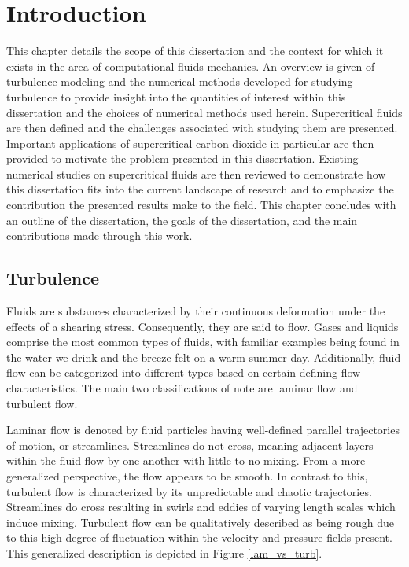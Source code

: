 \chapter{Introduction}
This chapter details the scope of this dissertation and the context for which it exists in the area of computational fluids mechanics. An overview is given of turbulence modeling and the numerical methods developed for studying turbulence to provide insight into the quantities of interest within this dissertation and the choices of numerical methods used herein. Supercritical fluids are then defined and the challenges associated with studying them are presented. Important applications of supercritical carbon dioxide in particular are then provided to motivate the problem presented in this dissertation. Existing numerical studies on supercritical fluids are then reviewed to demonstrate how this dissertation fits into the current landscape of research and to emphasize the contribution the presented results make to the field. This chapter concludes with an outline of the dissertation, the goals of the dissertation, and the main contributions made through this work. 

\section{Turbulence}
Fluids are substances characterized by their continuous deformation under the effects of a shearing stress. Consequently, they are said to flow. Gases and liquids comprise the most common types of fluids, with familiar examples being found in the water we drink and the breeze felt on a warm summer day. Additionally, fluid flow can be categorized into different types based on certain defining flow characteristics. The main two classifications of note are laminar flow and turbulent flow.

Laminar flow is denoted by fluid particles having well-defined parallel trajectories of motion, or streamlines. Streamlines do not cross, meaning adjacent layers within the fluid flow by one another with little to no mixing. From a more generalized perspective, the flow appears to be smooth. In contrast to this, turbulent flow is characterized by its unpredictable and chaotic trajectories. Streamlines do cross resulting in swirls and eddies of varying length scales which induce mixing. Turbulent flow can be qualitatively described as being rough due to this high degree of fluctuation within the velocity and pressure fields present. This generalized description is depicted in Figure \ref{lam_vs_turb}.

